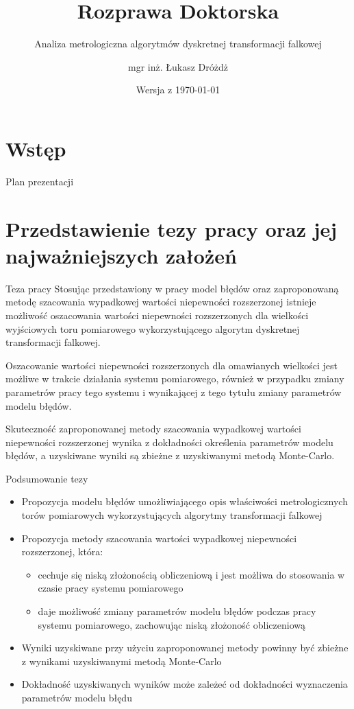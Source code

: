 \documentclass[12pt, polish, aspectratio = 169]{beamer}
\title{Rozprawa Doktorska}
\author{mgr inż. Łukasz Dróżdż}
\subtitle{Analiza metrologiczna algorytmów dyskretnej transformacji falkowej}
\institute{Politechnika Śląska, Wydział Elektryczny \\ Katedra Metrologii, Elektroniki i Automatyki}
\date{Wersja \gitVer{} z \today{}}
\begin{document}
\section*{Wstęp}

\begin{frame}[plain]
\titlepage
\end{frame}

\begin{frame}{Plan prezentacji}
\tableofcontents
\end{frame}

\section{Przedstawienie tezy pracy oraz jej najważniejszych założeń}

\begin{frame}{Teza pracy}
\justifying
Stosując przedstawiony w pracy model błędów oraz zaproponowaną metodę szacowania wypadkowej wartości niepewności rozszerzonej istnieje możliwość oszacowania wartości niepewności rozszerzonych dla wielkości wyjściowych toru pomiarowego wykorzystującego algorytm dyskretnej transformacji falkowej.

Oszacowanie wartości niepewności rozszerzonych dla omawianych wielkości jest możliwe w trakcie działania systemu pomiarowego, również w przypadku zmiany parametrów pracy tego systemu i wynikającej z tego tytułu zmiany parametrów modelu błędów.

Skuteczność zaproponowanej metody szacowania wypadkowej wartości niepewności rozszerzonej wynika z dokładności określenia parametrów modelu błędów, a uzyskiwane wyniki są zbieżne z uzyskiwanymi metodą Monte-Carlo.
\end{frame}

\begin{frame}{Podsumowanie tezy}
\begin{itemize}
\item Propozycja modelu błędów umożliwiającego opis właściwości metrologicznych torów pomiarowych wykorzystujących algorytmy transformacji falkowej
\item Propozycja metody szacowania wartości wypadkowej niepewności rozszerzonej, która:
	\begin{itemize}
	\item cechuje się niską złożonością obliczeniową i jest możliwa do stosowania w czasie pracy systemu pomiarowego
	\item daje możliwość zmiany parametrów modelu błędów podczas pracy systemu pomiarowego, zachowując niską złożoność obliczeniową
	\end{itemize}
\item Wyniki uzyskiwane przy użyciu zaproponowanej metody powinny być zbieżne z wynikami uzyskiwanymi metodą Monte-Carlo
\item Dokładność uzyskiwanych wyników może zależeć od dokładności wyznaczenia parametrów modelu błędu
\end{itemize}
\end{frame}
\end{document}
